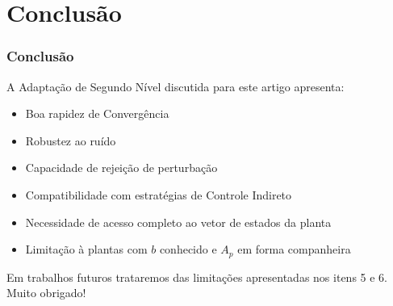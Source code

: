 \documentclass[aspectratio=169]{beamer}
\begin{document}
\section{Conclusão}
\begin{frame}
\frametitle{Conclusão}

A Adaptação de Segundo Nível discutida para este artigo apresenta:

\begin{itemize}
\item[1] Boa rapidez de Convergência
\item[2] Robustez ao ruído
\item[3] Capacidade de rejeição de perturbação
\item[4] Compatibilidade com estratégias de Controle Indireto
\item[5] Necessidade de acesso completo ao vetor de estados da planta
\item[6] Limitação à plantas com $b$ conhecido e $A_p$ em forma companheira
\end{itemize}

Em trabalhos futuros trataremos das limitações apresentadas nos itens 5 e 6. Muito obrigado!

\end{frame}




\end{document}
